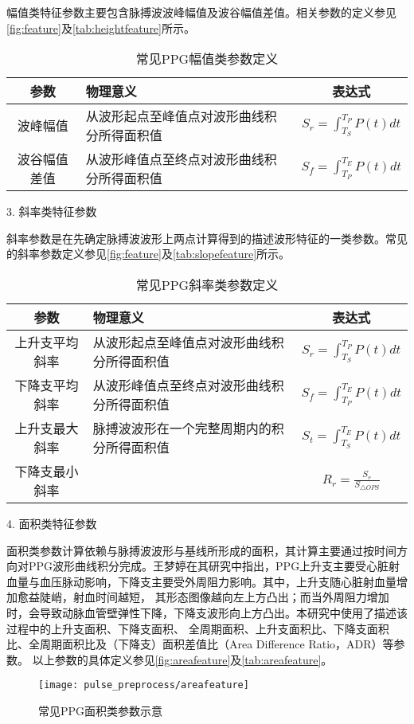 幅值类特征参数主要包含脉搏波波峰幅值及波谷幅值差值。相关参数的定义参见\autoref{fig:feature}及\autoref{tab:heightfeature}所示。
\begin{table}[htbp]
    \centering
    \caption{\label{tab:heightfeature}常见PPG幅值类参数定义}
    \begin{tabularx}{\linewidth}{cX<{\centering}c}
    \toprule
    \textbf{参数} & \textbf{物理意义} & \textbf{表达式} \\
    \midrule
    波峰幅值      &  从波形起点至峰值点对波形曲线积分所得面积值         &  $S_r=\int_{T_S}^{T_P}P(t)dt$\\
    波谷幅值差值      &  从波形峰值点至终点对波形曲线积分所得面积值         &  $S_f=\int_{T_P}^{T_E}P(t)dt$\\
    \bottomrule
    \end{tabularx}
\end{table}

3. 斜率类特征参数

斜率参数是在先确定脉搏波波形上两点计算得到的描述波形特征的一类参数。常见的斜率参数定义参见\autoref{fig:feature}及\autoref{tab:slopefeature}所示。
\begin{table}[htbp]
    \centering
    \caption{\label{tab:slopefeature}常见PPG斜率类参数定义}
    \begin{tabularx}{\linewidth}{cX<{\centering}c}
    \toprule
    \textbf{参数} & \textbf{物理意义} & \textbf{表达式} \\
    \midrule
    上升支平均斜率      &  从波形起点至峰值点对波形曲线积分所得面积值         &  $S_r=\int_{T_S}^{T_P}P(t)dt$\\
    下降支平均斜率      &  从波形峰值点至终点对波形曲线积分所得面积值         &  $S_f=\int_{T_P}^{T_E}P(t)dt$\\
    上升支最大斜率      &  脉搏波波形在一个完整周期内的积分所得面积值         &  $S_t=\int_{T_S}^{T_E}P(t)dt$\\
    下降支最小斜率    &           &   $R_r=\frac{S_r}{S_{\triangle OPS}}$    \\
    \bottomrule
    \end{tabularx}
\end{table}

4. 面积类特征参数

面积类参数计算依赖与脉搏波波形与基线所形成的面积，其计算主要通过按时间方向对PPG波形曲线积分完成。王梦婷在其研究中指出\cite{mmt}，PPG上升支主要受心脏射血量与血压脉动影响，下降支主要受外周阻力影响。其中，上升支随心脏射血量增加愈益陡峭，射血时间越短，
其形态图像越向左上方凸出；而当外周阻力增加时，会导致动脉血管壁弹性下降，下降支波形向上方凸出。本研究中使用了描述该过程中的上升支面积、下降支面积、
全周期面积、上升支面积比、下降支面积比、全周期面积比及（下降支）面积差值比（Area Difference Ratio，ADR）\cite{Feng2018}等参数。
以上参数的具体定义参见\autoref{fig:areafeature}及\autoref{tab:areafeature}。
\begin{figure}[htbp]
    \centering
    \texttt{[image: pulse\_preprocess/areafeature]}
    \caption{\label{fig:areafeature}常见PPG面积类参数示意}
\end{figure}

